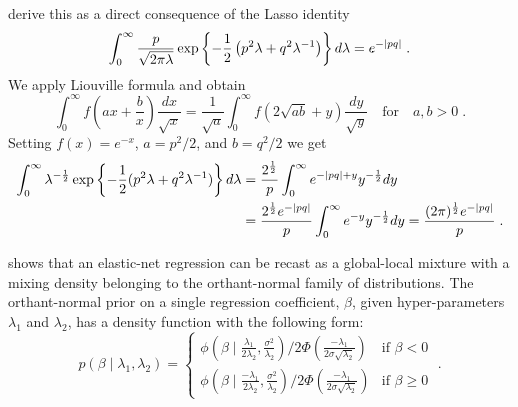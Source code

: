 \documentclass[lineno]{biometrika}
\begin{document}
\citet{polson_data_2011} derive this as a direct consequence of the Lasso identity 
$$
\int_0^{\infty} \frac{p}{\sqrt{2 \pi \lambda}} 
\exp\left\{-\frac{1}{2} \left(p^2 \lambda+q^2 \lambda^{-1}\right)\right\} d\lambda 
= e^{-|pq|}
\;.
$$ 
We apply Liouville formula and obtain
$$
\int_{0}^{\infty} f\left(ax + \frac{b}{x} \right) \frac{dx}{\sqrt{x}} 
= \frac{1}{\sqrt{a}} \int_{0}^{\infty} f\left(2\sqrt{ab} + y \right) \frac{dy}{\sqrt{y}}
\quad\text{for}\quad a, b > 0
\;.  
$$
Setting $f(x) = e^{-x}$, $a = p^2/2$, and $b = q^2/2$ we get
\begin{align*}
  \int_0^{\infty} \lambda^{-\frac{1}{2}} 
  \exp\left\{-\frac{1}{2}(p^2 \lambda + q^2 \lambda^{-1})\right\} d\lambda 
  &= \frac{2^{\frac{1}{2}}}{p} \int_0^{\infty} e^{-|pq| + y} y^{-\frac{1}{2}} d y 
  \\
  &= \frac{2^{\frac{1}{2}} e^{-|pq|}}{p} \int_0^{\infty} e^{-y} y^{-\frac{1}{2}} d y 
  = \frac{(2\pi)^{\frac{1}{2}} e^{-|pq|}}{p}
  \;.
\end{align*}

\citet{hans2011comment} shows that an elastic-net regression can be recast as a
global-local mixture with a mixing density belonging to the orthant-normal
family of distributions.  The orthant-normal prior on a single regression
coefficient, $\beta$, given hyper-parameters $\lambda_1$ and $\lambda_2$, 
has a density function with the following form:
\begin{equation}
  p(\beta \mid \lambda_1, \lambda_2)  = 
  \begin{cases} 
   \phi(\beta \mid \frac{\lambda_1}{2\lambda_2}, \frac{\sigma^2}{\lambda_2}) 
   / 2\Phi(\frac{-\lambda_1}{2\sigma\sqrt{\lambda_2}}) & \text{if } \beta < 0 
   \\
   \phi(\beta \mid \frac{-\lambda_1}{2\lambda_2}, \frac{\sigma^2}{\lambda_2}) / 
   2\Phi(\frac{-\lambda_1}{2\sigma\sqrt{\lambda_2}}) & \text{if } \beta \geq 0
  \end{cases} 
  \;.
  \label{eq:hans}
\end{equation}
\end{document}
